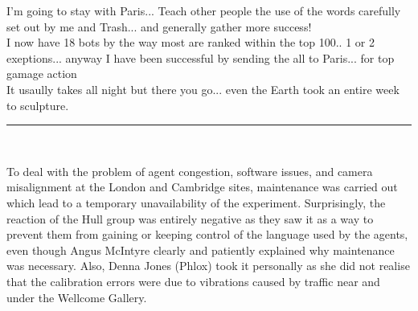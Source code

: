 \begin{mail}
I'm going to stay with Paris... Teach other people the use of the words carefully set out by me and Trash... and generally gather more success!\\
I now have 18 bots by the way most are ranked within the top 100.. 1 or 2 exeptions... anyway I have been successful by sending the all to Paris... for top gamage action \\
It usaully takes all night but there you go... even the Earth took an entire week to sculpture.\\
\rule{0.8\textwidth}{.4pt}\\

\end{mail}

To deal with the problem of agent congestion, software issues, and camera misalignment at the London 
and Cambridge sites, maintenance was carried out which lead to a temporary unavailability of the experiment. 
Surprisingly, the reaction of the Hull group was entirely negative as they saw it as a 
way to prevent them from gaining or keeping control of the language used by the agents, even though 
Angus McIntyre clearly and patiently explained why maintenance was necessary. Also, Denna Jones (Phlox) took 
it personally as she did not realise that the calibration errors were due to vibrations caused by
traffic near and under the Wellcome Gallery.  \\


